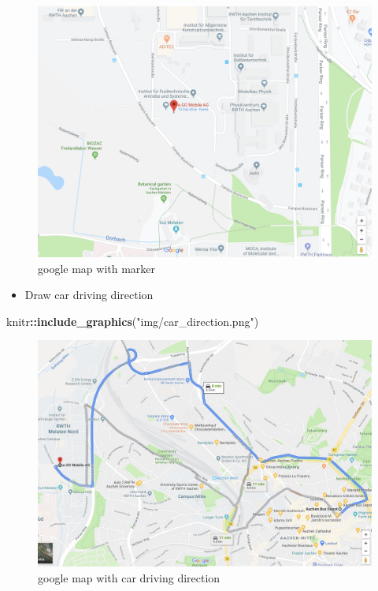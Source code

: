 \documentclass[]{book}
\newenvironment{Shaded}{\begin{snugshade}}{\end{snugshade}}
\newcommand{\KeywordTok}[1]{\textcolor[rgb]{0.13,0.29,0.53}{\textbf{#1}}}
\newcommand{\NormalTok}[1]{#1}
\newcommand{\OperatorTok}[1]{\textcolor[rgb]{0.81,0.36,0.00}{\textbf{#1}}}
\newcommand{\StringTok}[1]{\textcolor[rgb]{0.31,0.60,0.02}{#1}}
\providecommand{\tightlist}{%
  \setlength{\itemsep}{0pt}\setlength{\parskip}{0pt}}
\begin{document}
\begin{figure}

{\centering \includegraphics[width=29.72in]{img/google_marker} 

}

\caption{google map with marker}\label{fig:marker}
\end{figure}

\begin{itemize}
\tightlist
\item
  Draw car driving direction
\end{itemize}

\begin{Shaded}
\begin{Highlighting}[]
\NormalTok{knitr}\OperatorTok{::}\KeywordTok{include_graphics}\NormalTok{(}\StringTok{"img/car_direction.png"}\NormalTok{)}
\end{Highlighting}
\end{Shaded}

\begin{figure}

{\centering \includegraphics[width=33.78in]{img/car_direction} 

}

\caption{google map with car driving direction}\label{fig:direction}
\end{figure}
\end{document}
